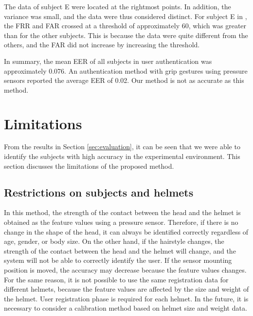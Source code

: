 \documentclass[english,preprint,JIP]{ipsj}
\begin{document}
The data of subject E were located at the rightmost points. In addition, the variance was small, and the data were thus considered distinct. For subject E in , the FRR and FAR crossed at a threshold of approximately 60, which was greater than for the other subjects. This is because the data were quite different from the others, and the FAR did not increase by increasing the threshold.\par

In summary, the mean EER of all subjects in user authentication was approximately 0.076. An authentication method with grip gestures using pressure sensors\cite{murao_grip} reported the average EER of 0.02. Our method is not as accurate as this method.



\section{Limitations}
\label{sec:limitation}
From the results in Section \ref{sec:evaluation}, it can be seen that we were able to identify the subjects with high accuracy in the experimental environment. This section discusses the limitations of the proposed method.


\subsection{Restrictions on subjects and helmets}
\label{sec:subjects_and_helmets}
In this method, the strength of the contact between the head and the helmet is obtained as the feature values using a pressure sensor. Therefore, if there is no change in the shape of the head, it can always be identified correctly regardless of age, gender, or body size. On the other hand, if the hairstyle changes, the strength of the contact between the head and the helmet will change, and the system will not be able to correctly identify the user. If the sensor mounting position is moved, the accuracy may decrease because the feature values changes. For the same reason, it is not possible to use the same registration data for different helmets, because the feature values are affected by the size and weight of the helmet. User registration phase is required for each helmet. In the future, it is necessary to consider a calibration method based on helmet size and weight data.


\end{document}
